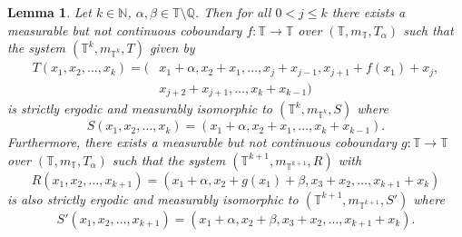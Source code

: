 \documentclass[12pt]{amsart}
\theoremstyle{definition}
\theoremstyle{plain}
\newtheorem{lemma}[theorem]{Lemma}
\theoremstyle{definition}
\numberwithin{equation}{section}
\begin{document}







\begin{lemma} \label{coboundary is a coboundary is a ...}
     Let $k \in \mathbb{N}$, $\alpha,\beta \in \mathbb{T}\setminus\mathbb{Q}$. Then for all $0<j\leq k$ there exists a measurable but not continuous coboundary $f\colon \mathbb{T} \rightarrow \mathbb{T}$ over $(\mathbb{T},m_{\mathbb{T}},T_{\alpha})$ such that the system $(\mathbb{T}^{k},m_{\mathbb{T}^{k}},T)$ given by 
\begin{align*}
T(x_1,x_2,\dots,x_{k})=\Big(&x_1+\alpha,x_2+x_1,\dots,x_{j}+x_{j-1},x_{j+1}+f(x_1)+x_{j},\\ &x_{j+2}+x_{j+1},\dots,x_{k}+x_{k-1}\Big)
\end{align*}
     is strictly ergodic and measurably isomorphic to $(\mathbb{T}^{k},m_{\mathbb{T}^{k}},S)$ where $$S(x_1,x_2,\dots,x_{k})=(x_1+\alpha,x_2+x_1,\dots,x_{k}+x_{k-1}).$$ Furthermore, there exists a measurable but not continuous coboundary $g\colon\mathbb{T}\rightarrow \mathbb{T}$ over $(\mathbb{T},m_{\mathbb{T}},T_{\alpha})$ such that the system $(\mathbb{T}^{k+1},m_{\mathbb{T}^{k+1}},R)$ with $$R(x_1,x_2,\dots,x_{k+1})=(x_1+\alpha,x_2+g(x_1)+\beta,x_3+x_2,\dots,x_{k+1}+x_k)$$ is also strictly ergodic and measurably isomorphic to $(\mathbb{T}^{k+1},m_{\mathbb{T}^{k+1}},S')$ where $$S'(x_1,x_2,\dots,x_{k+1})=(x_1+\alpha,x_2+\beta,x_3+x_2,\dots,x_{k+1}+x_k).$$
\end{lemma}
\end{document}
